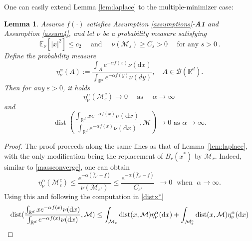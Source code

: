 \documentclass[reqno]{amsart}
\numberwithin{algorithm}{section}
\newcommand{\diff}{\mathrm{d}}
\newcommand{\dd}{\mathrm{d}}
\newcommand{\RR}{\mathbb{R}}
\newcommand{\EE}{{\mathbb E}}
\newcommand{\mc}[1]{\mathcal{#1}}
\newtheorem{lemma}[theorem]{Lemma}
\begin{document}
{One can easily extend Lemma \ref{lem:laplace} to the multiple-minimizer case:
\begin{lemma}\label{lem:laplace'}
    Assume $f(\cdot)$ satisfies Assumption \ref{assumptions}-\textbf{A1} and Assumption \ref{assum4}, and let $\nu$ be a probability measure satisfying
    \begin{equation}\label{eq:nuassum'}
        \EE_\nu[|x|^2]\leq c_2\quad \mbox{ and }\quad  \nu (\mathcal{M}_s)\geq C_s>0\quad \mbox{ for any } s>0\,.
    \end{equation}
Define the probability measure
    \begin{equation}\label{eq:eta'}
        \eta_\nu^\alpha(A):=\frac{\int_{A}e^{-\alpha f(x)}\nu(\diff x)}{\int_{\RR^d}e^{-\alpha f(y)}\nu(dy)},\quad A\in \mc{B}(\RR^d).
    \end{equation}
    Then for any $\varepsilon>0$, it holds 
    \begin{equation}\label{eq: massconv'}
        \eta_\nu^\alpha( \mathcal{M}_\varepsilon^c)\longrightarrow 0  \quad \mbox{ as }  \quad \alpha \to \infty\,
    \end{equation}
and 
    \begin{equation}\label{eq: meanconv'}
      \operatorname{dist}(\frac{\int_{\RR^d} x e^{-\alpha f(x)}\nu(\diff x)}{\int_{\RR^d}e^{-\alpha f(x)}\nu(\diff x)}, \mc{M})\to 0 \mbox{ as }\alpha\to\infty.
    \end{equation}
\end{lemma}
\begin{proof}
The proof proceeds along the same lines as that of Lemma~\ref{lem:laplace}, with the only modification being the replacement of $B_r(x^*)$ by $\mathcal{M}_r$. Indeed, similar to \eqref{massconverge}, one can obtain
\begin{equation*}
     \eta_\nu^\alpha(\mathcal{M}_\varepsilon^c)
   \leq \frac{e^{-\alpha (\overline f_{\varepsilon'} - \underline f)}}{\nu(\mathcal{M}_{\varepsilon'})}\leq \frac{e^{-\alpha (\overline f_{\varepsilon'} - \underline f)}}{C_{\varepsilon'}}\,\; \to 0 \; \mbox{ when } \;\alpha \to \infty.
\end{equation*}
Using this and following the computation in \eqref{distx*}
\begin{align*}
   \operatorname{dist}(\frac{\int_{\RR^d} x e^{-\alpha f(x)}\nu(\diff x)}{\int_{\RR^d}e^{-\alpha f(x)}\nu(\diff x)}, \mc{M})&\leq \int_{\mc{M}_\varepsilon}\operatorname{dist}(x,\mc{M})\eta_\nu^\alpha(\dd x)+\int_{\mc{M}_\varepsilon^c}\operatorname{dist}(x,\mc M)\eta_\nu^\alpha(\dd x)\notag\\

\end{align*}
\end{proof}}
\end{document}
